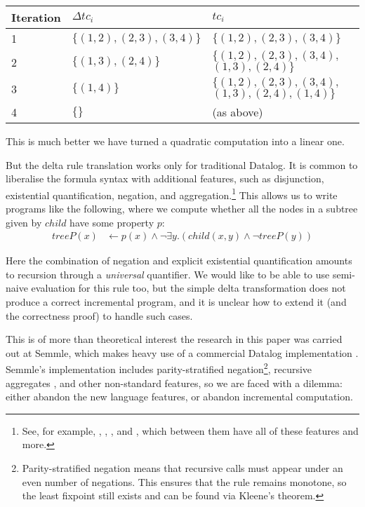 \begin{center}
  \begin{tabular} {p{3.5em} p{8em} p{10em}}
    Iteration & $\Delta tc_i$ & $tc_i$ \\
    \toprule
    1 & $\{ (1, 2), (2, 3), (3, 4) \}$ & $\{ (1, 2), (2, 3), (3, 4) \}$\\
    2 & $\{ (1, 3), (2, 4) \}$ & $\{ (1, 2), (2, 3), (3, 4),$ $(1, 3), (2, 4) \}$\\
    3 & $\{ (1, 4) \}$ & $\{ (1, 2), (2, 3), (3, 4),$ $(1, 3), (2, 4), (1, 4) \}$\\
    4 & $\{ \}$ & (as above) \\
    \bottomrule
  \end{tabular}
\end{center}
\medskip

This is much better \textemdash{} we have turned a quadratic computation into a linear one.

But the delta rule translation works only for traditional Datalog. It is common to
liberalise the formula syntax with additional features, such as disjunction,
existential quantification, negation, and aggregation.\footnote{ See, for
  example, \autocites(LogiQL)(){logicbloxWebsite}{halpin2014logiql},
  \autocites(Datomic)(){datomicWebsite},
  \autocites(Souffle)(){souffleWebsite}{scholz2016fast}, and
  \autocites(DES)(){saenz2011deductive}, which between them have all of these
  features and more. } 
This allows us to write programs like the following, where we compute whether all the
nodes in a subtree given by $child$ have some property $p$:
\begin{align*}
  treeP(x) &\leftarrow p(x) \wedge \neg \exists y . (child(x,y) \wedge \neg treeP(y))
\end{align*}

Here the combination of negation and explicit existential quantification amounts
to recursion through a \emph{universal} quantifier. We would
like to be able to use semi-naive evaluation for this rule too, but the simple delta
transformation does not produce a correct incremental program, and it is unclear how to extend it (and the
correctness proof) to handle such cases.

This is of more than theoretical interest \textemdash{} the research
in this paper was carried out at Semmle, which
makes heavy use of a commercial Datalog implementation
\autocites{semmleWebsite}{avgustinov2016ql}{sereni2008adding}{schafer2010type}.
Semmle's implementation includes parity-stratified negation\footnote{Parity-stratified negation means that recursive calls must
  appear under an even number of negations. This ensures that the rule remains
  monotone, so the least fixpoint still exists and can be found via Kleene's
  theorem.}, recursive aggregates \autocite{demoor2013aggregates}, and other non-standard
features, so we are faced with a dilemma: either abandon the new language
features, or abandon incremental computation.

